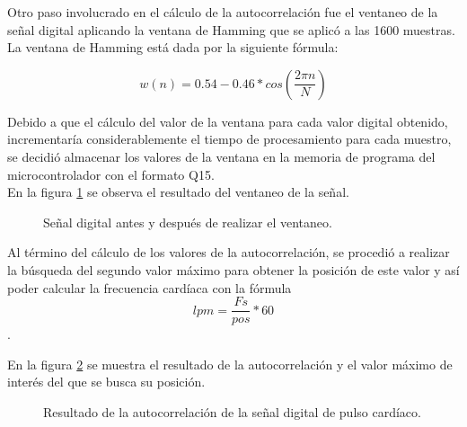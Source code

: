 Otro paso involucrado en el cálculo de la autocorrelación fue el ventaneo de la señal digital aplicando la ventana de Hamming que se aplicó a las 1600 muestras. La ventana de Hamming está dada por la siguiente fórmula: 

$$w(n) = 0.54 - 0.46 * cos(\frac{2\pi n}{N})$$

Debido a que el cálculo del valor de la ventana para cada valor digital obtenido, incrementaría considerablemente el tiempo de procesamiento para cada muestro, se decidió almacenar los valores de la ventana en la memoria de programa del microcontrolador con el formato Q15. \\

En la figura \ref{fig:ventaneo} se observa el resultado del ventaneo de la señal. \\

\begin{figure}[htbp!]
	\centering
	\caption{Señal digital antes y después de realizar el ventaneo.}
	\label{fig:ventaneo}
\end{figure}

Al término del cálculo de los valores de la autocorrelación, se procedió a realizar la búsqueda del segundo valor máximo para obtener la posición de este valor y así poder calcular la frecuencia cardíaca con la fórmula $$lpm = \frac{Fs}{pos} * 60$$. 

En la figura \ref{fig:autocorr} se muestra el resultado de la autocorrelación y el valor máximo de interés del que se busca su posición. \\

\begin{figure}[htbp!]
	\centering
	\caption{Resultado de la autocorrelación de la señal digital de pulso cardíaco.}
	\label{fig:autocorr}
\end{figure}

